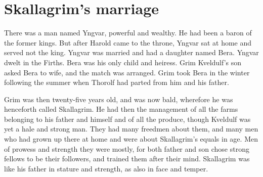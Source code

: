 \chapter{Skallagrim's marriage}
There was a man named Yngvar, powerful and wealthy. He had been a baron of the former kings. But after Harold came to the throne, Yngvar sat at home and served not the king. Yngvar was married and had a daughter named Bera. Yngvar dwelt in the Firths. Bera was his only child and heiress. Grim Kveldulf's son asked Bera to wife, and the match was arranged. Grim took Bera in the winter following the summer when Thorolf had parted from him and his father.

Grim was then twenty-five years old, and was now bald, wherefore he was henceforth called Skallagrim. He had then the management of all the farms belonging to his father and himself and of all the produce, though Kveldulf was yet a hale and strong man. They had many freedmen about them, and many men who had grown up there at home and were about Skallagrim's equals in age. Men of prowess and strength they were mostly, for both father and son chose strong fellows to be their followers, and trained them after their mind. Skallagrim was like his father in stature and strength, as also in face and temper.
